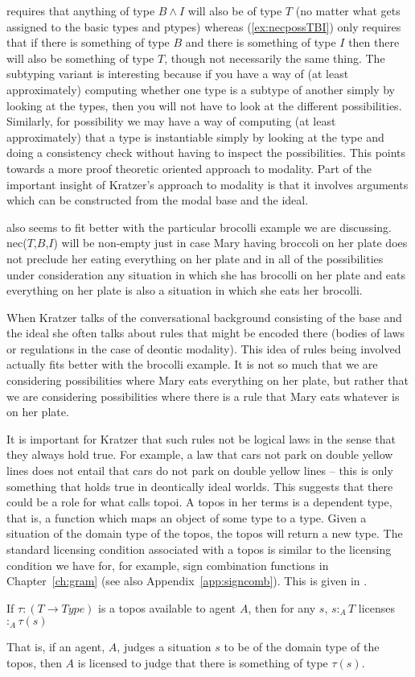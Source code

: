 \preveg{} requires that anything of type $B\wedge I$ will also be of
type $T$ (no matter what gets assigned to the basic types and ptypes)
whereas (\ref{ex:necpossTBI}) only requires that if there is something
of type $B$ and there is something of type $I$ then there will also be something of type $T$, though
not necessarily the same thing.  The subtyping variant is interesting
because if you have a way of (at least approximately) computing
whether one type is a subtype of another simply by looking at the
types, then you will not have to look at the different possibilities.
Similarly, for possibility we may have a way of computing (at least
approximately) that a type is instantiable simply by looking at the
type and doing a consistency check without having to inspect the
possibilities.  This points towards a more proof theoretic oriented
approach to modality.  Part of the important insight of Kratzer's
approach to modality is that it involves arguments which can be
constructed from the modal base and the ideal.

\preveg{} also seems to fit better with the particular brocolli
example we are discussing.  nec($T$,$B$,$I$) will be non-empty just in
case Mary having broccoli on her plate does not preclude her eating
everything on her plate and in all of the possibilities under
consideration any situation in which she has brocolli on her plate and
eats everything on her plate is also a situation in which she eats her brocolli.

When Kratzer talks of the conversational background consisting of the
base and the ideal she often talks about rules that might be encoded
there (bodies of laws or regulations in the case of deontic
modality).  This idea of rules being involved actually fits better
with the brocolli example.  It is not so much that we are considering
possibilities where Mary eats everything on her plate, but rather that
we are considering possibilities where there is a rule that Mary eats
whatever is on her plate.

It is important for Kratzer that such rules not be logical laws in the sense
that they always hold true.  For example, a law that cars not park on
double yellow lines does not entail that cars do not park on double
yellow lines -- this is only something that holds true in deontically
ideal worlds.  This suggests that there could be a role for what
\cite{Breitholtz2014a} calls topoi.  A topos in her terms is a
dependent type, that is, a function which maps an object of some type
to a type.  Given a situation of the domain type of the topos, the
topos will return a new type.  The standard licensing condition
associated with a topos is similar to the licensing condition we have
for, for example, sign combination functions in Chapter~\ref{ch:gram}
(see also Appendix~\ref{app:signcomb}).  This is given in \nexteg{}.
\begin{ex} 
If $\tau:(T\rightarrow Type)$ is a topos available to agent $A$, then for
any $s$, $s :_A T$ licenses $:_A \tau(s)$ 
\label{ex:topos-license}
\end{ex} 
That is, if an agent, $A$, judges a situation $s$ to be of the domain type
of the topos, then $A$ is licensed to judge that there is something 
of type $\tau(s)$.  

